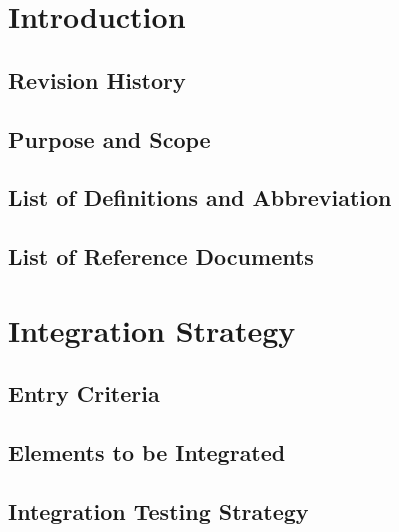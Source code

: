 \documentclass{article}
\begin{document}
\title{}
\author{Boriero Stefano  876106  
Brunitti Simone   875039 }


\maketitle

\newpage
\tableofcontents

\newpage
\section{Introduction}

\subsection{Revision History}
\subsection{Purpose and Scope}



\subsection{List of Definitions and	Abbreviation}


\subsection{List of Reference Documents}

\newpage
\section{Integration Strategy}

\subsection{Entry Criteria}


\subsection{Elements to be Integrated}


\subsection{Integration Testing Strategy}

\end{document}
